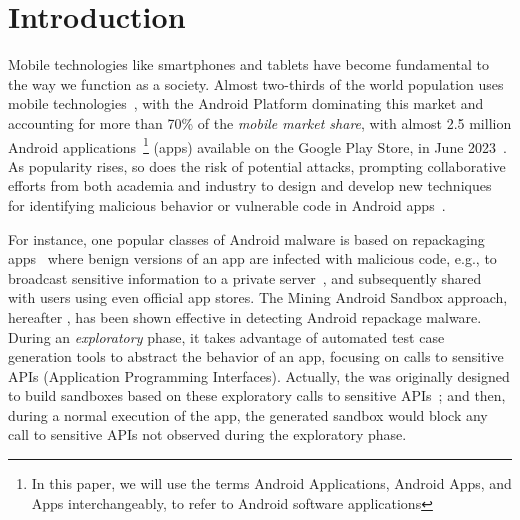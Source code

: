 \section{Introduction}\label{sec:introduction}

Mobile technologies like smartphones and tablets have become fundamental to the way we function as a society. Almost two-thirds of the world population
uses mobile technologies~\cite{Comscore,DBLP:journals/tse/MartinSJZH17}, with the
Android Platform dominating this market and accounting for more than 70\% of the \emph{mobile
market share}, with almost 2.5 million Android applications~\footnote{In this paper, we will use the terms Android Applications, Android Apps, and Apps interchangeably, to refer to Android software applications} (apps)
available on the Google Play Store, in June 2023~\cite{Statista}.  
As popularity rises, so does the risk of potential attacks, prompting collaborative efforts from both academia and industry to design and develop new techniques for identifying malicious behavior or vulnerable code in Android apps~\cite{10.1145/3017427}.

For instance, one popular classes of Android malware is based on repackaging apps~\cite{DBLP:conf/wcre/BaoLL18,le2018towards} where benign
versions of an app are
infected with malicious code, e.g., to broadcast
sensitive information to a private server~\cite{DBLP:journals/tse/LiBK21}, and subsequently shared
with users using even official app stores. The Mining Android Sandbox approach, hereafter \mas, has been shown effective
in detecting Android repackage malware. 
During an \emph{exploratory} phase, it takes advantage of automated test case generation tools to abstract the behavior of an app, focusing on calls to sensitive APIs (Application Programming Interfaces). Actually, the \mas was originally designed to build sandboxes based on these exploratory calls to sensitive APIs~\cite{DBLP:conf/icse/JamrozikSZ16}; and then, during a normal execution of the app, the generated sandbox would block any call to sensitive APIs not observed during the exploratory phase. 

